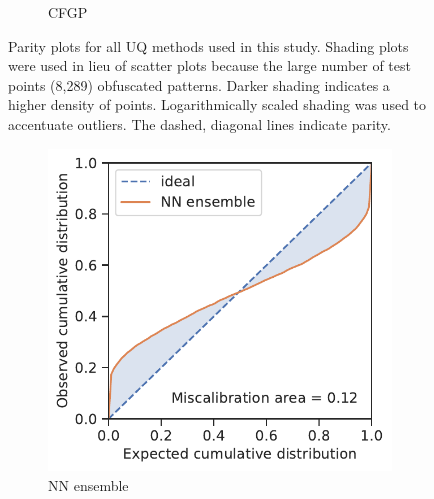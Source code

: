 \documentclass[]{achemso}
\begin{document}
\begin{figure}
\begin{subfigure}{0.32\textwidth}
        \caption{\gls{CFGP}}\label{fig:parity_cfgp}
    \end{subfigure}
    \caption{Parity plots for all \gls{UQ} methods used in this study.
    Shading plots were used in lieu of scatter plots because the large number of test points (8,289) obfuscated patterns.
    Darker shading indicates a higher density of points.
    Logarithmically scaled shading was used to accentuate outliers.
    The dashed, diagonal lines indicate parity.}\label{fig:parity}
\end{figure}

\begin{figure}
    \centering
    \begin{subfigure}{0.32\textwidth}
        \includegraphics[width=\textwidth]{../NN_ensemble/calibration.pdf}
        \caption{\gls{NN} ensemble}\label{fig:calibration_ensemble}
    \end{subfigure}
    \begin{subfigure}{0.32\textwidth}

\end{subfigure}
\end{figure}
\end{document}
